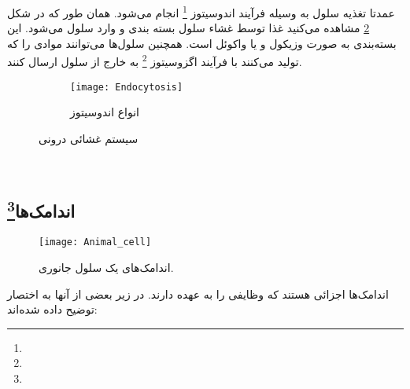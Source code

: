 عمدتا تغذیه سلول به وسیله فرآیند اندوسیتوز
\footnote{}
انجام می‌شود. همان طور که در شکل
\ref{figure:Endocytosis}
مشاهده می‌کنید غذا توسط غشاء سلول بسته بندی و وارد سلول می‌شود.
این بسته‌بندی به صورت وزیکول و یا واکوئل است.
همچنین سلول‌ها می‌توانند موادی را که تولید می‌کنند با فرآیند اگزوسیتوز
\footnote{}
به خارج از سلول ارسال کنند.

\pagebreak
\begin{figure}[t]
	\centering

    \qquad
    	\bigskip
	
	\begin{subfigure}[b]{0.85\textwidth}
		\centering
		\texttt{[image: Endocytosis]}
		\caption{انواع اندوسیتوز}
		\label{figure:Endocytosis}
	\end{subfigure}	
	\caption{سیستم غشائی درونی}
\end{figure} 

~

\pagebreak
\subsection{اندامک‌ها\protect\footnote{}}

\begin{figure}[t]
	\centering
	\texttt{[image: Animal\_cell]}
	\caption{ اندامک‌های یک سلول جانوری.
	}
	\label{figure:Organelle}
\end{figure}

اندامک‌ها اجزائی هستند که وظایفی را به عهده دارند.  در زیر بعضی از آنها به اختصار توضیح داده شده‌اند:

